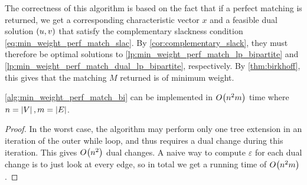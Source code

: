 The correctness of this algorithm is based on the fact that if a perfect matching is returned,
we get a corresponding characteristic vector $x$ and a feasible dual solution $\left( u, v \right)$ that satisfy 
the complementary slackness condition \cref{eq:min_weight_perf_match_slac}. By \cref{cor:complementary_slack}, they must 
therefore be optimal solutions to \cref{lp:min_weight_perf_match_lp_bipartite} and \cref{lp:min_weight_perf_match_dual_lp_bipartite}, respectively. 
By \cref{thm:birkhoff}, this gives that the matching $M$ returned is of minimum weight. 

\begin{theorem}
    \cref{alg:min_weight_perf_match_bi} can be implemented in $O_{} \! \left( n^2m \right)$ time where 
    $n = \left\lvert V \right\rvert, m = \left\lvert E \right\rvert$. 
    \label{thm:min_weight_perf_match_bi_runtime}
\end{theorem}
\begin{proof}
    In the worst case, the algorithm may perform only one tree extension in an iteration of the outer while loop, 
    and thus requires a dual change during this iteration. This gives $O_{} \! \left( n^2 \right)$ dual changes. 
    A naive way to compute $\varepsilon$ for each dual change is to just look at every edge, so in total we get 
    a running time of $O_{} \! \left( n^2m \right)$. 
\end{proof}
